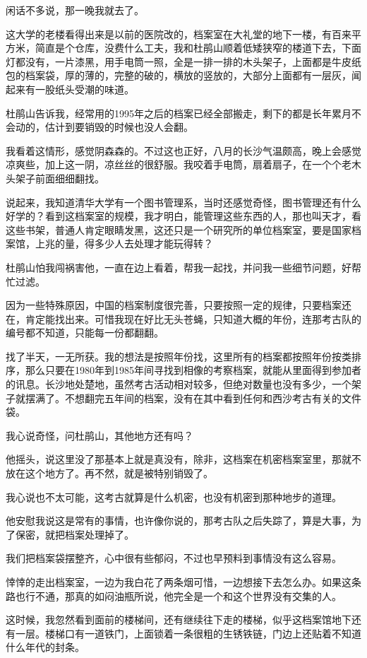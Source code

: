 闲话不多说，那一晚我就去了。

这大学的老楼看得出来是以前的医院改的，档案室在大礼堂的地下一楼，有百来平方米，简直是个仓库，没费什么工夫，我和杜鹃山顺着低矮狭窄的楼道下去，下面灯都没有，一片漆黑，用手电筒一照，全是一排一排的木头架子，上面都是牛皮纸包的档案袋，厚的薄的，完整的破的，横放的竖放的，大部分上面都有一层灰，闻起来有一股纸头受潮的味道。

杜鹃山告诉我，经常用的1995年之后的档案已经全部搬走，剩下的都是长年累月不会动的，估计到要销毁的时候也没人会翻。

我看着这情形，感觉阴森森的。不过这也正好，八月的长沙气温颇高，晚上会感觉凉爽些，加上这一阴，凉丝丝的很舒服。我咬着手电筒，扇着扇子，在一个个老木头架子前面细细翻找。

说起来，我知道清华大学有一个图书管理系，当时还感觉奇怪，图书管理还有什么好学的？看到这档案室的规模，我才明白，能管理这些东西的人，那也叫天才，看这些书架，普通人肯定眼睛发黑，这还只是一个研究所的单位档案室，要是国家档案馆，上兆的量，得多少人去处理才能玩得转？

杜鹃山怕我闯祸害他，一直在边上看着，帮我一起找，并问我一些细节问题，好帮忙过滤。

因为一些特殊原因，中国的档案制度很完善，只要按照一定的规律，只要档案还在，肯定能找出来。可惜我现在好比无头苍蝇，只知道大概的年份，连那考古队的编号都不知道，只能每一份都翻翻。

找了半天，一无所获。我的想法是按照年份找，这里所有的档案都按照年份按类排序，那么只要在1980年到1985年间寻找到相像的考察档案，就能从里面得到参加者的讯息。长沙地处楚地，虽然考古活动相对较多，但绝对数量也没有多少，一个架子就摆满了。不想翻完五年间的档案，没有在其中看到任何和西沙考古有关的文件袋。

我心说奇怪，问杜鹃山，其他地方还有吗？

他摇头，说这里没了那基本上就是真没有，除非，这档案在机密档案室里，那就不放在这个地方了。再不然，就是被特别销毁了。

我心说也不太可能，这考古就算是什么机密，也没有机密到那种地步的道理。

他安慰我说这是常有的事情，也许像你说的，那考古队之后失踪了，算是大事，为了保密，就把档案处理掉了。

我们把档案袋摆整齐，心中很有些郁闷，不过也早预料到事情没有这么容易。

悻悻的走出档案室，一边为我白花了两条烟可惜，一边想接下去怎么办。如果这条路也行不通，那真的如闷油瓶所说，他完全是一个和这个世界没有交集的人。

这时候，我忽然看到面前的楼梯间，还有继续往下走的楼梯，似乎这档案馆地下还有一层。楼梯口有一道铁门，上面锁着一条很粗的生锈铁链，门边上还贴着不知道什么年代的封条。

